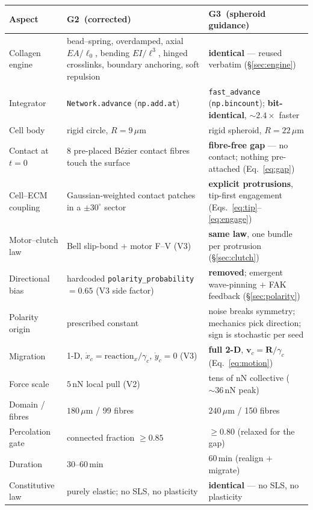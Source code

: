 \documentclass[11pt]{article}
\newcommand{\umt}{\mu\text{m}}            %
\newcommand{\um}{\,\umt}
\newcommand{\nN}{\,\text{nN}}
\newcommand{\GTwo}{\textcolor{g2col}{\textbf{G2}}}
\newcommand{\GThree}{\textcolor{g3col}{\textbf{G3}}}
\newcommand{\code}[1]{\texttt{\small #1}}
\begin{document}
\begin{longtable}{@{}p{} p{} p{}@{}}
\toprule
\textbf{Aspect} & \textbf{\GTwo\ (corrected)} & \textbf{\GThree\ (spheroid guidance)} \\
\midrule
\endhead
Collagen engine & bead--spring, overdamped, axial $EA/\ell_0$, bending $EI/\ell^3$, hinged crosslinks, boundary anchoring, soft repulsion & \textbf{identical} --- reused verbatim (\S\ref{sec:engine}) \\
Integrator & \code{Network.advance} (\code{np.add.at}) & \code{fast\_advance} (\code{np.bincount}); \textbf{bit-identical}, $\sim2.4\times$ faster \\
Cell body & rigid circle, $R=9\um$ & rigid spheroid, $R=22\um$ \\
Contact at $t=0$ & 8 pre-placed Bézier contact fibres touch the surface & \textbf{fibre-free gap} --- no contact; nothing pre-attached (Eq.~\ref{eq:gap}) \\
Cell--ECM coupling & Gaussian-weighted contact patches in a $\pm30^\circ$ sector & \textbf{explicit protrusions}, tip-first engagement (Eqs.~\ref{eq:tip}--\ref{eq:engage}) \\
Motor--clutch law & Bell slip-bond $+$ motor F--V (V3) & \textbf{same law}, one bundle per protrusion (\S\ref{sec:clutch}) \\
Directional bias & hardcoded \code{polarity\_probability}$=0.65$ (V3 side factor) & \textbf{removed}; emergent wave-pinning $+$ FAK feedback (\S\ref{sec:polarity}) \\
Polarity origin & prescribed constant & noise breaks symmetry; mechanics pick direction; sign is stochastic per seed \\
Migration & 1-D, $\dot x_c=\text{reaction}_x/\gamma_c$, $\dot y_c=0$ (V3) & \textbf{full 2-D}, $\mathbf v_c=\mathbf R/\gamma_c$ (Eq.~\ref{eq:motion}) \\
Force scale & $5\nN$ local pull (V2) & tens of nN collective ($\sim\!36\nN$ peak) \\
Domain / fibres & $180\um$ / 99 fibres & $240\um$ / 150 fibres \\
Percolation gate & connected fraction $\ge0.85$ & $\ge0.80$ (relaxed for the gap) \\
Duration & $30$--$60\,\text{min}$ & $60\,\text{min}$ (realign $+$ migrate) \\
Constitutive law & purely elastic; no SLS, no plasticity & \textbf{identical} --- no SLS, no plasticity \\
\bottomrule
\end{longtable}
\end{document}
